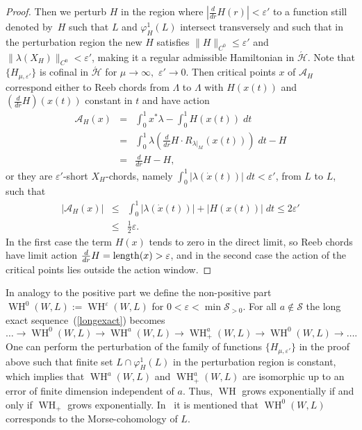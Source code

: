 \documentclass{amsart}
\newcommand{\Acal}{{\mathcal{A}}}
\newcommand{\Hcal}{{\mathcal{H}}}
\newcommand{\Scal}{{\mathcal{S}}}
\newcommand{\WslantH}{\operatorname{WH}}
\theoremstyle{definition}
\theoremstyle{remark}
\numberwithin{equation}{section}
\begin{document}
\begin{proof}
\noindent Then we perturb $H$ in the region where $|\frac{d}{dr}H(r)|<\varepsilon'$ to a function still denoted by~$H$ such that $L$ and $\varphi_H^1(L)$ intersect transversely and such that in the perturbation region the new $H$ satisfies $\|H\|_{C^0}\leq \varepsilon'$ and $\|\lambda(X_H)\|_{C^0}<\varepsilon'$, making it a regular admissible Hamiltonian in $\acute\Hcal$. Note that $\{H_{\mu,\varepsilon'}\}$ is cofinal in $\acute\Hcal$ for $\mu\to\infty,$ $\varepsilon'\to0$. Then critical points $x$ of $\Acal_H$ correspond either to Reeb chords from $\Lambda$ to $\Lambda$ with $H(x(t))$ and $(\frac d{dr}H)(x(t))$ constant in $t$ and have action 
	\begin{eqnarray*}
		\Acal_H(x) &=& \int_0^1 x^*\lambda-\int_0^1 H(x(t))\;dt\\
		&=& \int_0^1\lambda\left(\frac d{dr}H \cdot R_{\lambda|_M}(x(t))\right)\; dt-H\\
		&=& \frac d{dr}H-H,
	\end{eqnarray*}
or they are $\varepsilon'$-short $X_H$-chords, namely $\int_0^1|\lambda(\dot x(t))|\;dt<\varepsilon'$, from $L$ to $L$, such that 
	\begin{eqnarray*}
		|\Acal_H(x)| &\leq& \int_0^1 |\lambda(\dot x(t))|+ |H(x(t))|\;dt\leq 2\varepsilon'\\
		&\leq& \frac12\varepsilon.
	\end{eqnarray*}
In the first case the term $H(x)$ tends to zero in the direct limit, so Reeb chords have limit action $\frac d{dr}H={\rm length}(x)>\varepsilon$, and in the second case the action of the critical points lies outside the action window.  
\end{proof}

In analogy to the positive part we define the non-positive part $\WslantH^0(W,L):=\WslantH^{\varepsilon}(W,L)$ for $0<\varepsilon<\min\Scal_{>0}$. For all $a\notin\Scal$ the long exact sequence~(\ref{longexact}) becomes
\begin{equation*}
	\ldots\to \WslantH^0(W,L)\to \WslantH^{a}(W,L)\to \WslantH_+^{a}(W,L)\to \WslantH^0(W,L)\to\ldots.
\end{equation*}
One can perform the perturbation of the family of functions $\{H_{\mu,\varepsilon'}\}$ in the proof above such that finite set $L\cap\varphi_H^1(L)$ in the perturbation region is constant, which implies that $\WslantH^{a}(W,L)$ and $\WslantH^{a}_+(W,L)$ are isomorphic up to an error of finite dimension independent of $a$. Thus, $\WslantH$ grows exponentially if and only if $\WslantH_+$ grows exponentially. In~\cite{CO17} it is mentioned that $\WslantH^0(W,L)$ corresponds to the Morse-cohomology of $L$. 
\end{document}
